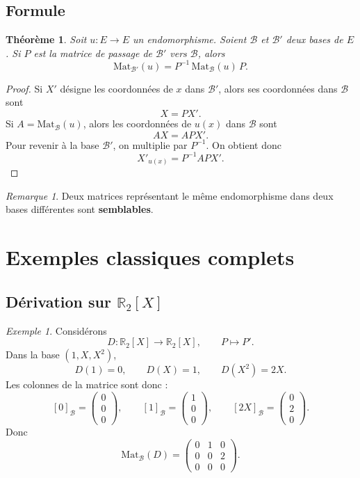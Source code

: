 \documentclass[11pt,a4paper]{article}
\newtheorem{theoreme}[definition]{Théorème}
\theoremstyle{remark}
\newtheorem{remarque}[definition]{Remarque}
\newtheorem{exemple}[definition]{Exemple}
\newcommand{\R}{\mathbb{R}}
\begin{document}
\subsection{Formule}

\begin{theoreme}
Soit \(u:E\to E\) un endomorphisme. Soient \(\mathcal B\) et \(\mathcal B'\) deux bases de \(E\). Si \(P\) est la matrice de passage de \(\mathcal B'\) vers \(\mathcal B\), alors
\[
\mathrm{Mat}_{\mathcal B'}(u)=P^{-1}\,\mathrm{Mat}_{\mathcal B}(u)\,P.
\]
\end{theoreme}

\begin{proof}
Si \(X'\) désigne les coordonnées de \(x\) dans \(\mathcal B'\), alors ses coordonnées dans \(\mathcal B\) sont
\[
X=PX'.
\]
Si \(A=\mathrm{Mat}_{\mathcal B}(u)\), alors les coordonnées de \(u(x)\) dans \(\mathcal B\) sont
\[
AX=APX'.
\]
Pour revenir à la base \(\mathcal B'\), on multiplie par \(P^{-1}\). On obtient donc
\[
X'_{u(x)}=P^{-1}APX'.
\]
\end{proof}

\begin{remarque}
Deux matrices représentant le même endomorphisme dans deux bases différentes sont \textbf{semblables}.
\end{remarque}

\section{Exemples classiques complets}

\subsection{Dérivation sur \(\R_2[X]\)}

\begin{exemple}
Considérons
\[
D:\R_2[X]\to \R_2[X],\qquad P\mapsto P'.
\]
Dans la base \((1,X,X^2)\),
\[
D(1)=0,\qquad D(X)=1,\qquad D(X^2)=2X.
\]
Les colonnes de la matrice sont donc :
\[
[0]_{\mathcal B}=
\begin{pmatrix}
0\\
0\\
0
\end{pmatrix},
\qquad
[1]_{\mathcal B}=
\begin{pmatrix}
1\\
0\\
0
\end{pmatrix},
\qquad
[2X]_{\mathcal B}=
\begin{pmatrix}
0\\
2\\
0
\end{pmatrix}.
\]
Donc
\[
\mathrm{Mat}_{\mathcal B}(D)=
\begin{pmatrix}
0 & 1 & 0\\
0 & 0 & 2\\
0 & 0 & 0
\end{pmatrix}.
\]
\end{exemple}
\end{document}

